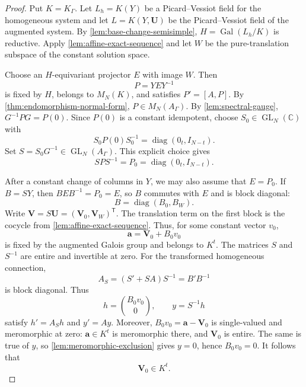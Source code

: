 \documentclass[11pt]{article}
\numberwithin{equation}{section}
\theoremstyle{definition}
\theoremstyle{remark}
\newcommand{\C}{\mathbb C}
\begin{document}
\begin{proof}
Put $K=K_\Gamma$.  Let $L_h=K(Y)$ be a Picard--Vessiot field for the
homogeneous system and let $L=K(Y,\mathbf U)$ be the Picard--Vessiot field
of the augmented system.  By \cref{lem:base-change-semisimple},
$H=\operatorname{Gal}(L_h/K)$ is reductive.  Apply
\cref{lem:affine-exact-sequence} and let $W$ be the pure-translation
subspace of the constant solution space.

Choose an $H$-equivariant projector $E$ with image $W$.  Then
\[
  P=YEY^{-1}
\]
is fixed by $H$, belongs to $M_N(K)$, and satisfies $P'=[A,P]$.  By
\cref{thm:endomorphism-normal-form}, $P\in M_N(A_\Gamma)$.
By \cref{lem:spectral-gauge}, $G^{-1}PG=P(0)$.  Since $P(0)$ is a
constant idempotent, choose $S_0\in\operatorname{GL}_N(\C)$ with
\[
  S_0P(0)S_0^{-1}=\operatorname{diag}(0_t,I_{N-t}).
\]
Set $S=S_0G^{-1}\in\operatorname{GL}_N(A_\Gamma)$.  This explicit choice
gives
\begin{equation}\label{eq:standard-projector}
  SPS^{-1}=P_0=\operatorname{diag}(0_t,I_{N-t}).
\end{equation}

After a constant change of columns in $Y$, we may also assume that
$E=P_0$.  If $B=SY$, then $BE B^{-1}=P_0=E$, so $B$ commutes with $E$ and
is block diagonal:
\[
  B=\operatorname{diag}(B_0,B_W).
\]
Write $\mathbf V=S\mathbf U=(\mathbf V_0,\mathbf V_W)^{\mathsf T}$.
The translation term on the first block is the cocycle from
\cref{lem:affine-exact-sequence}.  Thus, for some constant vector $v_0$,
\[
  \mathbf a=\mathbf V_0+B_0v_0
\]
is fixed by the augmented Galois group and belongs to $K^t$.  The matrices $S$ and $S^{-1}$ are entire and invertible at zero.
For the transformed homogeneous connection,
\[
  A_S=(S'+SA)S^{-1}=B'B^{-1}
\]
is block diagonal.  Thus
\[
  h=\binom{B_0v_0}{0},\qquad y=S^{-1}h
\]
satisfy $h'=A_Sh$ and $y'=Ay$.  Moreover,
$B_0v_0=\mathbf a-\mathbf V_0$ is single-valued and meromorphic at zero:
$\mathbf a\in K^t$ is meromorphic there, and $\mathbf V_0$ is entire.
The same is true of $y$, so \cref{lem:meromorphic-exclusion} gives
$y=0$, hence $B_0v_0=0$.  It follows that
\begin{equation}\label{eq:V0-in-K}
  \mathbf V_0\in K^t.
\end{equation}


\end{proof}
\end{document}
